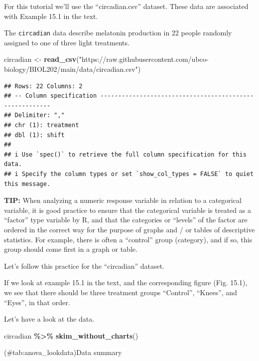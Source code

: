 \documentclass[
]{book}
\newenvironment{Shaded}{\begin{snugshade}}{\end{snugshade}}
\newcommand{\FunctionTok}[1]{\textcolor[rgb]{0.13,0.29,0.53}{\textbf{#1}}}
\newcommand{\NormalTok}[1]{#1}
\newcommand{\OtherTok}[1]{\textcolor[rgb]{0.56,0.35,0.01}{#1}}
\newcommand{\SpecialCharTok}[1]{\textcolor[rgb]{0.81,0.36,0.00}{\textbf{#1}}}
\newcommand{\StringTok}[1]{\textcolor[rgb]{0.31,0.60,0.02}{#1}}
\begin{document}
For this tutorial we'll use the ``circadian.csv'' dataset. These data are associated with Example 15.1 in the text.

The \texttt{circadian} data describe melatonin production in 22 people randomly assigned to one of three light treatments.

\begin{Shaded}
\begin{Highlighting}[]
\NormalTok{circadian }\OtherTok{\textless{}{-}} \FunctionTok{read\_csv}\NormalTok{(}\StringTok{"https://raw.githubusercontent.com/ubco{-}biology/BIOL202/main/data/circadian.csv"}\NormalTok{)}
\end{Highlighting}
\end{Shaded}

\begin{verbatim}
## Rows: 22 Columns: 2
## -- Column specification --------------------------------------------------------
## Delimiter: ","
## chr (1): treatment
## dbl (1): shift
## 
## i Use `spec()` to retrieve the full column specification for this data.
## i Specify the column types or set `show_col_types = FALSE` to quiet this message.
\end{verbatim}

\textbf{TIP:}
When analyzing a numeric response variable in relation to a categorical variable, it is good practice to ensure that the categorical variable is treated as a ``factor'' type variable by R, and that the categories or ``levels'' of the factor are ordered in the correct way for the purpose of graphs and / or tables of descriptive statistics. For example, there is often a ``control'' group (category), and if so, this group should come first in a graph or table.

Let's follow this practice for the ``circadian'' dataset.

If we look at example 15.1 in the text, and the corresponding figure (Fig. 15.1), we see that there should be three treatment groups ``Control'', ``Knees'', and ``Eyes'', in that order.

Let's have a look at the data.

\begin{Shaded}
\begin{Highlighting}[]
\NormalTok{circadian }\SpecialCharTok{\%\textgreater{}\%}
  \FunctionTok{skim\_without\_charts}\NormalTok{()}
\end{Highlighting}
\end{Shaded}

(\#tab:anova\_lookdata)Data summary
\end{document}
